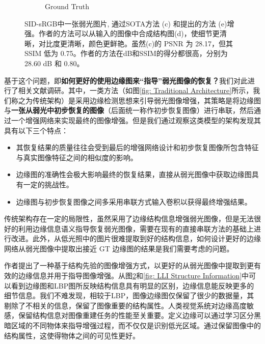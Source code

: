 \documentclass[a4paper]{ctexart}
\begin{document}
\begin{figure}[htb]
\begin{subfigure}{0.25\columnwidth}
			\captionsetup{font=scriptsize}
			\caption{Ground Truth}
			\label{fig: Ground Truth}
		\end{subfigure}
		\caption{
			\label{fig: Structural Information}
			SID-sRGB\cite{chen2018learning}中一张弱光图片, 通过SOTA方法 (c) 和\cite{xu2023low}提出的方法 (e)增强。作者的方法可以从输入的图像中合成结构图(d)，使细节更清晰，对比度更清晰，颜色更鲜艳。虽然(c)的 PSNR 为 28.17，但其 SSIM 低为 0.75。作者的方法在dB和SSIM\cite{wang2004image}的得分都很高，分别为28.60 dB 和 0.80。
		}
	\end{figure}
	\FloatBarrier
	
	基于这个问题，即\textbf{如何更好的使用边缘图来“指导”弱光图像的恢复？}我们对此进行了相关文献调研。其中，一类方法（如图\ref{fig: Traditional Architecture}所示，我们称之为传统架构）是采用边缘检测思想来引导弱光图像增强，其策略是将边缘图与\textbf{一张从弱光中初步恢复的图像}（后面统一称作初步恢复图像）进行串联，然后通过一个增强网络来实现最终的图像增强\cite{zhu2020eemefn, rana2021edge}。但是我们通过观察这类模型的架构发现其具有以下三个特点：

	\begin{itemize}
		\item [(1)] 其恢复结果的质量往往会受到最后的增强网络设计和初步恢复图像所包含特征与真实图像特征之间的相似度的影响。
		
		\item [(2)] 边缘图的准确性会极大影响最终的恢复结果，直接从弱光图像中获取边缘图具有一定的挑战性。
		
		\item [(3)] 边缘图与初步恢复图像之间多采用串联方式输入卷积以获得最终增强结果。
	\end{itemize}
	
	传统架构存在一定的局限性，虽然采用了边缘结构信息增强弱光图像，但是无法很好的利用边缘信息语义指导恢复弱光图像，需要在现有的直接串联方法的基础上进行改进。此外，从低光照中的图片很难提取到好的结构信息，如何设计更好的边缘网络从弱光图像中提取出接近 GT 边缘图的结果是我们需要考虑的问题。
	
	作者\cite{xu2023low}提出了一种基于结构先验的图像增强方式，以更好的从弱光图像中提取到更有效的边缘信息并用于指导图像增强。从图\ref{fig: Structural Information}和\ref{fig: LLI Structure Information}中可以看到边缘图和LBP图\cite{pietikainen2010local}所反映结构信息具有明显的区别，边缘信息能反映更多的细节信息。我们不难发现，相较于LBP，图像边缘图仅保留了很少的数据量，其剔除了不相关的信息，保留了图像重要的结构属性。人类视觉系统对边缘高度敏感，保留结构信息对图像重建任务的性能至关重要。定义边缘可以通过学习区分黑暗区域的不同物体来指导增强过程，而不仅仅是识别低光区域。通过保留图像中的结构属性，这使得物体之间的可见性更好。
	
\end{document}
